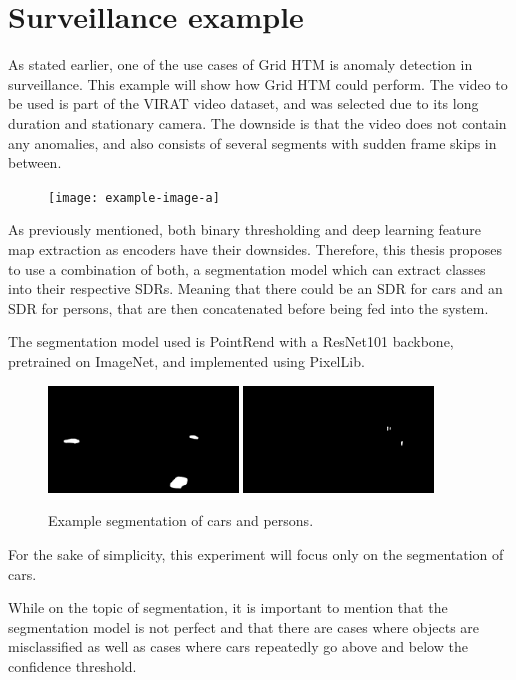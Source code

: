 \section{Surveillance example}
As stated earlier, one of the use cases of Grid HTM is anomaly detection in surveillance. This example will show how Grid HTM could perform.
The video to be used is part of the VIRAT\cite{VIRAT} video dataset, and was selected due to its long duration and stationary camera. The downside is that the video does not contain any anomalies, and also consists of several segments with sudden frame skips in between.
\begin{figure}[H]
    \centering
    \texttt{[image: example-image-a]}
\end{figure}
As previously mentioned, both binary thresholding and deep learning feature map extraction as encoders have their downsides. Therefore, this thesis proposes to use a combination of both, a segmentation model which can extract classes into their respective SDRs. Meaning that there could be an SDR for cars and an SDR for persons, that are then concatenated before being fed into the system.
\par
The segmentation model used is PointRend\cite{pointrend} with a ResNet101\cite{resnet} backbone, pretrained on ImageNet\cite{imagenet}, and implemented using PixelLib\cite{pixellib}.
\begin{figure}[H]
    \centering
    \includegraphics[width=0.45\textwidth]{resources/methodology/car_segmentation.png}
    \includegraphics[width=0.45\textwidth]{resources/methodology/person_segmentation.png}
    \caption{Example segmentation of cars and persons.}
\end{figure}
For the sake of simplicity, this experiment will focus only on the segmentation of cars.
\par
While on the topic of segmentation, it is important to mention that the segmentation model is not perfect and that there are cases where objects are misclassified as well as cases where cars repeatedly go above and below the confidence threshold.
